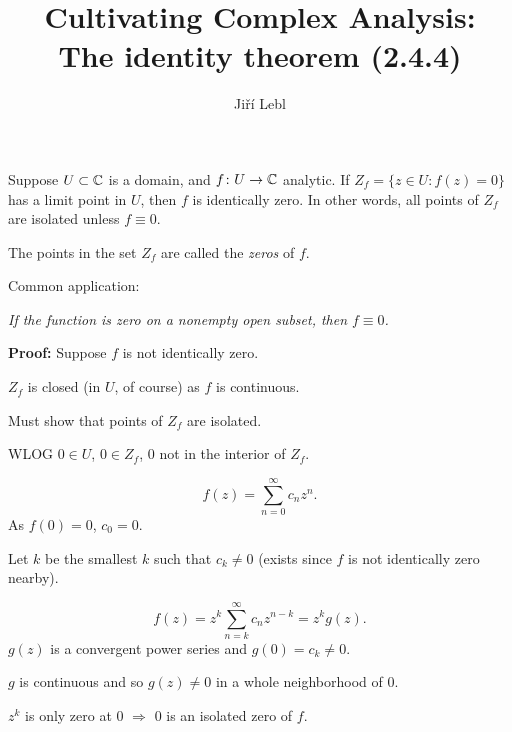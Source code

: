 \documentclass[10pt,aspectratio=169]{beamer}
\author{Ji\v{r}\'i Lebl}
\institute[OSU]{%
Departemento pri Matematiko de Oklahoma {\^S}tata Universitato}
\title{Cultivating Complex Analysis:\\%
The identity theorem (2.4.4)}
\date{}
\begin{document}
\begin{frame}
\titlepage
\end{frame}

\begin{frame}
\begin{theorem}[Identity]
Suppose $U \subset {\mathbb{C}}$ is a domain, 
and $f \colon U \to {\mathbb{C}}$ analytic.
\pause
If $Z_f = \bigl\{ z \in U : f(z) = 0 \bigr\}$
has a limit point in $U$, then $f$ is identically zero.
\pause
In other words, all points of $Z_f$ are isolated unless $f \equiv 0$.
\end{theorem}

\pause

\begin{definition}
The points in the set $Z_f$ are called the \emph{zeros} of $f$.
\end{definition}

\pause
\medskip

Common application:

\pause

\emph{If the function is zero on a nonempty open subset, then $f \equiv 0$.}

\end{frame}

\begin{frame}

\textbf{Proof:}
Suppose $f$ is not identically zero.

\medskip
\pause

$Z_f$ is closed (in $U$, of course) as $f$ is continuous.

\medskip
\pause

Must show that points of $Z_f$ are isolated.

\medskip
\pause

WLOG $0 \in U$, $0 \in Z_f$, $0$ not  in the interior of $Z_f$.

\pause

\[
f(z) = \sum_{n=0}^\infty c_n z^n .
\]
\pause
As $f(0) = 0$, $c_0 =0$.
\pause
\medskip

Let $k$ be the smallest $k$ such that $c_k \not=0$ (exists since $f$
is not identically zero nearby).

\pause

\[
f(z) = z^k \sum_{n=k}^\infty c_n z^{n-k} = z^k g(z) .
\]
$g(z)$ is a convergent power series and $g(0) = c_k \not=
0$.

\pause
\medskip

$g$ is continuous and so $g(z) \not= 0$ in a whole neighborhood of $0$.

\pause
\medskip

$z^k$ is only zero at $0$ $\Rightarrow$ $0$ is an isolated zero of $f$.

\end{frame}
\end{document}
